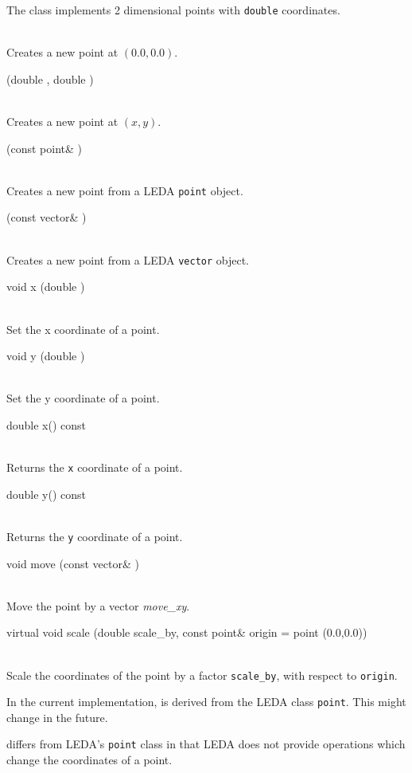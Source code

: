 \documentclass[twoside,fleqn]{report}
\begin{document}

The class  implements 2 dimensional points with 
\texttt{double} coordinates.

\begin{Cdefinition}
\item[\GT{Point()}] \strut\\
  Creates a new point at $(0.0,0.0)$.
\item[\GT{Point} (double \Param{x}, double \Param{y})] \strut\\
  Creates a new point at $(x,y)$.
\item[\GT{Point}(const point\& \Param{p})] \strut\\
  Creates a new point from a LEDA \texttt{point} object.
\item[\GT{Point} (const vector\& \Param{v})] \strut\\
  Creates a new point from a LEDA \texttt{vector} object.
\item[void x (double \Param{x})] \strut\\
  Set the x coordinate of a point.
\item[void y (double \Param{y})] \strut\\
  Set the y coordinate of a point.
\item[double x() const] \strut\\
  Returns the \texttt{x} coordinate of a point.
\item[double y() const] \strut\\
  Returns the \texttt{y} coordinate of a point.

  \item[void move (const vector\& \Param{move\_xy})] \strut\\
  Move the point by a vector \emph{move\_xy}.

  \item[virtual void scale (double scale\_by, const point\& origin = point (0.0,0.0))] \strut\\
  Scale the coordinates of the point by a factor
  \texttt{scale\_by}, with respect to \texttt{origin}.

\end{Cdefinition}


\begin{notes}
  
  \item In the current implementation,  is derived from
  the LEDA class \texttt{point}. This might change in the future.

  \item {} differs from LEDA's \texttt{point} class in that 
  LEDA does not provide operations which change the coordinates of a 
  point.

\end{notes}
\end{document}
